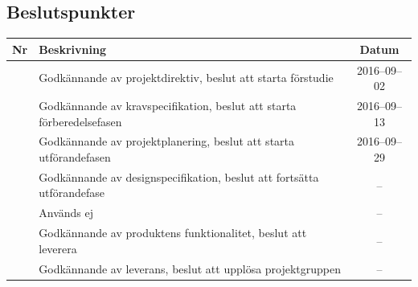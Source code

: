 \documentclass[a4paper,titlepage,12pt]{article}
\newcounter{bpNr}
\newcommand{\nextBPNr}{\stepcounter{bpNr}\arabic{bpNr}}
\begin{document}
	
	\subsection{Beslutspunkter}
	\renewcommand*{\arraystretch}{1.4}
	\begin{longtable}[c]{ c l c}
		\textbf{Nr} & \textbf{Beskrivning} & \textbf{Datum} \\ \midrule
		\nextBPNr{} & Godkännande av projektdirektiv, beslut att starta förstudie & 2016--09--02 \\ \midrule
		\nextBPNr{} & Godkännande av kravspecifikation, beslut att starta förberedelsefasen & 2016--09--13 \\ \midrule
		\nextBPNr{} & Godkännande av projektplanering, beslut att starta utförandefasen & 2016--09--29 \\ \midrule
		\nextBPNr{} & Godkännande av designspecifikation, beslut att fortsätta utförandefase & -- \\ \midrule
		\nextBPNr{} & Används ej & -- \\ \midrule
		\nextBPNr{} & Godkännande av produktens funktionalitet, beslut att leverera & -- \\ \midrule
		\nextBPNr{} & Godkännande av leverans, beslut att upplösa projektgruppen & -- \\ \midrule
	\end{longtable}
	
	
\end{document}
